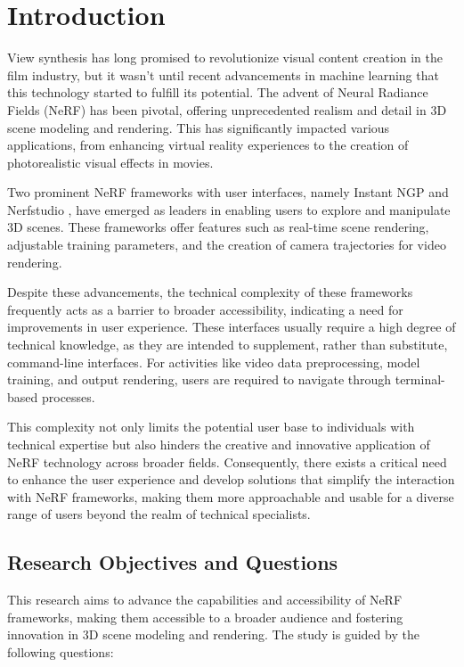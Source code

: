 %
\chapter{Introduction}
\label{sec:intro}

View synthesis has long promised to revolutionize visual content creation in the film industry, but it wasn't until recent advancements in machine learning that this technology started to fulfill its potential.
The advent of Neural Radiance Fields (NeRF) has been pivotal, offering unprecedented realism and detail in 3D scene modeling and rendering.
This has significantly impacted various applications, from enhancing virtual reality experiences to the creation of photorealistic visual effects in movies.

Two prominent NeRF frameworks with user interfaces, namely Instant NGP \cite{muller_instant_2022} and Nerfstudio \cite{tancik_nerfstudio_2023}, have emerged as leaders in enabling users to explore and manipulate 3D scenes. 
These frameworks offer features such as real-time scene rendering, adjustable training parameters, and the creation of camera trajectories for video rendering.

Despite these advancements, the technical complexity of these frameworks frequently acts as a barrier to broader accessibility, indicating a need for improvements in user experience. 
These interfaces usually require a high degree of technical knowledge, as they are intended to supplement, rather than substitute, command-line interfaces.
For activities like video data preprocessing, model training, and output rendering, users are required to navigate through terminal-based processes.

This complexity not only limits the potential user base to individuals with technical expertise but also hinders the creative and innovative application of NeRF technology across broader fields. 
Consequently, there exists a critical need to enhance the user experience and develop solutions that simplify the interaction with NeRF frameworks, making them more approachable and usable for a diverse range of users beyond the realm of technical specialists.


\section*{Research Objectives and Questions}
\label{sec:intro:objectives_questions}

This research aims to advance the capabilities and accessibility of NeRF frameworks, making them accessible to a broader audience and fostering innovation in 3D scene modeling and rendering. The study is guided by the following questions:

